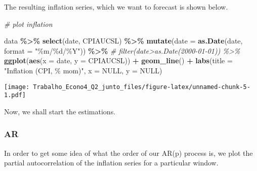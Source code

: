 \documentclass[
]{article}
\newenvironment{Shaded}{\begin{snugshade}}{\end{snugshade}}
\newcommand{\AttributeTok}[1]{\textcolor[rgb]{0.13,0.29,0.53}{#1}}
\newcommand{\CommentTok}[1]{\textcolor[rgb]{0.56,0.35,0.01}{\textit{#1}}}
\newcommand{\ConstantTok}[1]{\textcolor[rgb]{0.56,0.35,0.01}{#1}}
\newcommand{\DecValTok}[1]{\textcolor[rgb]{0.00,0.00,0.81}{#1}}
\newcommand{\FunctionTok}[1]{\textcolor[rgb]{0.13,0.29,0.53}{\textbf{#1}}}
\newcommand{\NormalTok}[1]{#1}
\newcommand{\OtherTok}[1]{\textcolor[rgb]{0.56,0.35,0.01}{#1}}
\newcommand{\SpecialCharTok}[1]{\textcolor[rgb]{0.81,0.36,0.00}{\textbf{#1}}}
\newcommand{\StringTok}[1]{\textcolor[rgb]{0.31,0.60,0.02}{#1}}
\begin{document}
\begin{Shaded}
\end{Shaded}

The resulting inflation series, which we want to forecast is shown
below.

\begin{Shaded}
\begin{Highlighting}[]
\CommentTok{\# plot inflation}

\NormalTok{data }\SpecialCharTok{\%\textgreater{}\%}
    \FunctionTok{select}\NormalTok{(date, CPIAUCSL) }\SpecialCharTok{\%\textgreater{}\%}
    \FunctionTok{mutate}\NormalTok{(}\AttributeTok{date =} \FunctionTok{as.Date}\NormalTok{(date, }\AttributeTok{format =} \StringTok{"\%m/\%d/\%Y"}\NormalTok{)) }\SpecialCharTok{\%\textgreater{}\%}
    \CommentTok{\# filter(date\textgreater{}as.Date(\textquotesingle{}2000{-}01{-}01\textquotesingle{})) \%\textgreater{}\%}
\FunctionTok{ggplot}\NormalTok{(}\FunctionTok{aes}\NormalTok{(}\AttributeTok{x =}\NormalTok{ date, }\AttributeTok{y =}\NormalTok{ CPIAUCSL)) }\SpecialCharTok{+} \FunctionTok{geom\_line}\NormalTok{() }\SpecialCharTok{+} \FunctionTok{labs}\NormalTok{(}\AttributeTok{title =} \StringTok{"Inflation (CPI, \% mom)"}\NormalTok{,}
    \AttributeTok{x =} \ConstantTok{NULL}\NormalTok{, }\AttributeTok{y =} \ConstantTok{NULL}\NormalTok{)}
\end{Highlighting}
\end{Shaded}

\texttt{[image: Trabalho\_Econo4\_Q2\_junto\_files/figure-latex/unnamed-chunk-5-1.pdf]}

Now, we shall start the estimations.

\hypertarget{ar}{%
\subsubsection{AR}\label{ar}}

In order to get some idea of what the order of our AR(p) process is, we
plot the partial autocorrelation of the inflation series for a
particular window.
\end{document}
